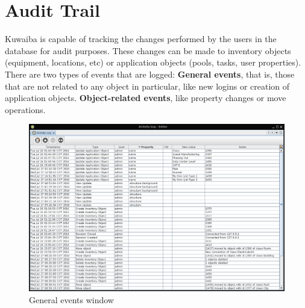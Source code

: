 \documentclass[a4paper]{article}
\begin{document}
	\section{Audit Trail} \label{sec:audit_trail}
	Kuwaiba is capable of tracking the changes performed by the users in the database for audit purposes. These changes can be made to inventory objects (equipment, locations, etc) or application objects (pools, tasks, user properties). There are two types of events that are logged: \textbf{General events}, that is, those that are not related to any object in particular, like new logins or creation of application objects. \textbf{Object-related events}, like property changes or move operations.
	\begin{figure}[h!]
		\centering
		\includegraphics[width=\linewidth]{img/audit_trail_general_events.png}
		\caption{General events window}
		\label{fig:audit_trail_general_events}
	\end{figure}
	
\end{document}
